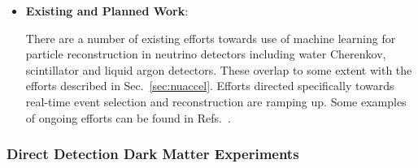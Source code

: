 \begin{itemize}

  
  
\item \textbf{Existing and Planned Work}:

  There are a number of existing efforts towards use of machine learning for particle reconstruction in neutrino detectors including water Cherenkov, scintillator and liquid argon detectors. These overlap to some extent with the efforts described in Sec.~\ref{sec:nuaccel}.  Efforts directed specifically towards real-time event selection and reconstruction are ramping up.
  Some examples of ongoing efforts can be found in Refs.~\cite{Abi_2020,Drielsma:2021jdv,Qian:2021vnh,Acciarri:2020ond,Abratenko:2020pbp,Wang:2020fjr,Psihas_2020}.  

  
  
\end{itemize}





\subsubsection{Direct Detection Dark Matter Experiments}

